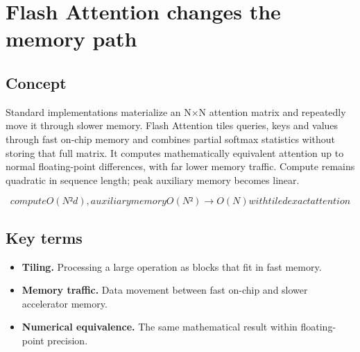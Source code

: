 \section{Flash Attention changes the memory path}

\begin{abstract}
Tiling avoids storing the full score matrix while preserving the attention calculation.
\end{abstract}

\subsection{Concept}
Standard implementations materialize an N×N attention matrix and repeatedly move it through slower memory. Flash Attention tiles queries, keys and values through fast on-chip memory and combines partial softmax statistics without storing that full matrix. It computes mathematically equivalent attention up to normal floating-point differences, with far lower memory traffic. Compute remains quadratic in sequence length; peak auxiliary memory becomes linear.

\begin{equation*}
compute O(N²d), auxiliary memory O(N²)  \rightarrow  O(N) with tiled exact attention
\end{equation*}

\subsection{Key terms}
\begin{itemize}
\item \textbf{Tiling.} Processing a large operation as blocks that fit in fast memory.
\item \textbf{Memory traffic.} Data movement between fast on-chip and slower accelerator memory.
\item \textbf{Numerical equivalence.} The same mathematical result within floating-point precision.
\end{itemize}
